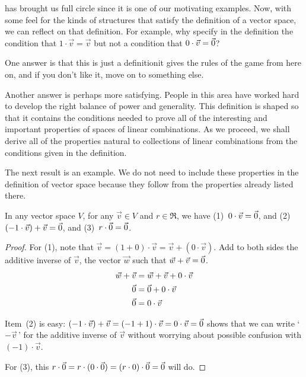  has brought us full circle since it is one of
our motivating examples.
Now, with some feel for the kinds of structures that satisfy the definition
of a vector space, we can reflect on that definition.
For example, why specify in the definition the condition that 
\( 1\cdot\vec{v}=\vec{v} \) but not a condition that \( 0\cdot\vec{v}=\vec{0} \)?

One answer is that this is just a definition\Dash it gives the rules of the
game from here on, and if you don't like it, move on to something else.

Another answer is perhaps more satisfying.
People in this area have worked hard to develop the
right balance of power and generality.
This definition is shaped so that it contains the conditions
needed to prove all of the interesting and
important properties of spaces of linear combinations.
As we proceed, we shall derive all of the properties natural to collections of
linear combinations from the conditions given in the definition.

The next result is an example.
We do not need to include these properties in the definition of vector space
because they follow from the properties already listed there.

\begin{lemma}
In any vector space \( V \), 
for any \( \vec{v}\in V \) and \( r\in\Re \), we have
(1)~\( 0\cdot\vec{v}=\vec{0} \), and
(2)~\( (-1\cdot\vec{v})+\vec{v}=\vec{0} \), and 
(3)~\( r\cdot\vec{0}=\vec{0} \).
\end{lemma}

\begin{proof}
For (1), note that 
\( \vec{v}=(1+0)\cdot\vec{v}=\vec{v}+(0\cdot\vec{v}) \).
Add to both sides the additive inverse of \( \vec{v} \),
the vector \( \vec{w} \) such that \( \vec{w}+\vec{v}=\vec{0} \).
\begin{align*}
  \vec{w}+\vec{v}
  &=\vec{w}+\vec{v}+0\cdot\vec{v}  \\
  \vec{0}
  &=\vec{0}+0\cdot\vec{v}                   \\
  \vec{0}
  &=0\cdot\vec{v}
\end{align*}

Item~(2) is easy:
\(  (-1\cdot\vec{v})+\vec{v}=(-1+1)\cdot\vec{v}=0\cdot\vec{v}=\vec{0} \)
shows that we can write `\( -\vec{v}\, \)' for the additive inverse
of \( \vec{v} \) without worrying about possible confusion with
\( (-1)\cdot\vec{v} \).

For (3), this
\( r\cdot\vec{0}
  =
  r\cdot(0\cdot\vec{0})
  =
  (r\cdot 0)\cdot\vec{0}
  =
  \vec{0} \)
will do.
\end{proof}

